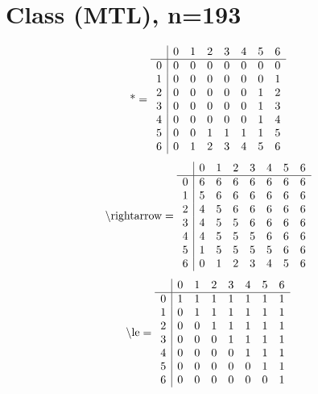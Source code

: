 \documentclass[11pt]{article}
\begin{document}
\section{Class (MTL), n=193}
\[\text{*} = 
\begin{array}{r | r r r r r r r}
 & 0 & 1 & 2 & 3 & 4 & 5 & 6 \\ \hline
0 & 0 & 0 & 0 & 0 & 0 & 0 & 0 \\
1 & 0 & 0 & 0 & 0 & 0 & 0 & 1 \\
2 & 0 & 0 & 0 & 0 & 0 & 1 & 2 \\
3 & 0 & 0 & 0 & 0 & 0 & 1 & 3 \\
4 & 0 & 0 & 0 & 0 & 0 & 1 & 4 \\
5 & 0 & 0 & 1 & 1 & 1 & 1 & 5 \\
6 & 0 & 1 & 2 & 3 & 4 & 5 & 6 \\
\end{array}
\]
\[\text{\textbackslash rightarrow} = 
\begin{array}{r | r r r r r r r}
 & 0 & 1 & 2 & 3 & 4 & 5 & 6 \\ \hline
0 & 6 & 6 & 6 & 6 & 6 & 6 & 6 \\
1 & 5 & 6 & 6 & 6 & 6 & 6 & 6 \\
2 & 4 & 5 & 6 & 6 & 6 & 6 & 6 \\
3 & 4 & 5 & 5 & 6 & 6 & 6 & 6 \\
4 & 4 & 5 & 5 & 5 & 6 & 6 & 6 \\
5 & 1 & 5 & 5 & 5 & 5 & 6 & 6 \\
6 & 0 & 1 & 2 & 3 & 4 & 5 & 6 \\
\end{array}
\]
\[\text{\textbackslash le} = 
\begin{array}{r | r r r r r r r}
 & 0 & 1 & 2 & 3 & 4 & 5 & 6 \\ \hline
0 & 1 & 1 & 1 & 1 & 1 & 1 & 1 \\
1 & 0 & 1 & 1 & 1 & 1 & 1 & 1 \\
2 & 0 & 0 & 1 & 1 & 1 & 1 & 1 \\
3 & 0 & 0 & 0 & 1 & 1 & 1 & 1 \\
4 & 0 & 0 & 0 & 0 & 1 & 1 & 1 \\
5 & 0 & 0 & 0 & 0 & 0 & 1 & 1 \\
6 & 0 & 0 & 0 & 0 & 0 & 0 & 1 \\
\end{array}
\]
\end{document}
